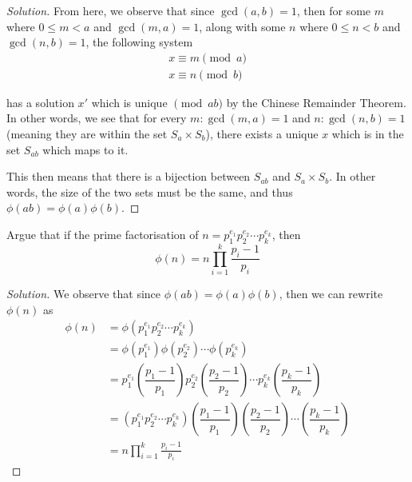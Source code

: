 \documentclass{article}
\newenvironment{solution}{\begin{proof}[Solution]}{\end{proof}}
\let\oldprod\prod
\renewcommand{\prod}[2]{\oldprod\limits_{#1}^{#2}}
\begin{document}
\begin{solution}
	From here, we observe that since $\gcd(a,b) = 1$, then for some $m$ where $0 \leq m < a$ and $\gcd(m,a) = 1$, along with some $n$ where $0 \leq n < b$ and $\gcd(n,b) = 1$, the following system
	\begin{align*}
		x \equiv m \pmod{a} \\
		x \equiv n \pmod{b}
	\end{align*}

	has a solution $x'$ which is unique $\pmod{ab}$ by the Chinese Remainder Theorem. In other words, we see that for every $m : \gcd(m,a) =1$ and $n : \gcd(n,b) = 1$ (meaning they are within the set $S_{a} \times S_{b}$), there exists a unique $x$ which is in the set $S_{ab}$ which maps to it.
	
	This then means that there is a bijection between $S_{ab}$ and $S_{a} \times S_{b}$. In other words, the size of the two sets must be the same, and thus $\phi(ab)=\phi(a)\phi(b)$.
%
\end{solution}

\begin{hw}
	Argue that if the prime factorisation of $n=p_{1}^{e_{1}}p_{2}^{e_{2}}\cdots p_{k}^{e_{k}}$, then
	\begin{equation*}
		\phi(n) = n \prod{i=1}{k} \frac{p_{i}-1}{p_{i}}
	\end{equation*}
\end{hw}
\begin{solution}
	We observe that since $\phi(ab) = \phi(a)\phi(b)$, then we can rewrite $\phi(n)$ as
	\begin{align*}
		\phi(n) &= \phi(p_{1}^{e_{1}}p_{2}^{e_{2}} \cdots p_{k}^{e_{k}}) \\
		&= \phi(p_{1}^{e_{1}}) \phi(p_{2}^{e_{2}}) \cdots \phi(p_{k}^{e_{k}}) \\
		&= p_{1}^{e_{1}}\left(\dfrac{p_{1} - 1}{p_{1}}\right) p_{2}^{e_{2}}\left(\dfrac{p_{2} - 1}{p_{2}}\right) \cdots
		p_{k}^{e_{k}}\left(\dfrac{p_{k} - 1}{p_{k}}\right) \\
		&= \left(p^{e_{1}}_1 p^{e_{2}}_{2} \cdots p^{e_{k}}_{k}\right)\left(\dfrac{p_{1} - 1}{p_{1}}\right)\left(\dfrac{p_{2} - 1}{p_{2}}\right) \cdots \left(\dfrac{p_{k} - 1}{p_{k}}\right) \\
		&= n \prod{i=1}{k} \frac{p_{i} - 1}{p_{i}}
	\end{align*}
\end{solution}
\end{document}
